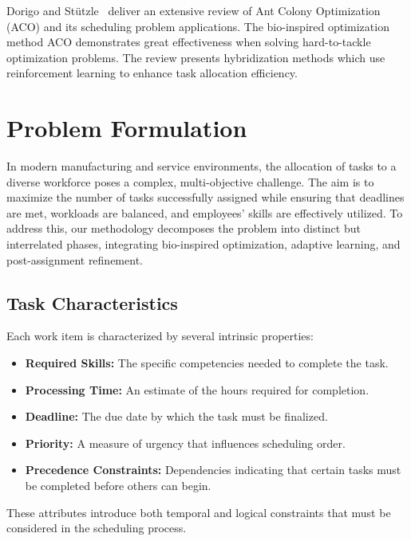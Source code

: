 \documentclass[%
aip,
cp,  %
amsmath,amssymb,
reprint,%
]{revtex4-2}
\begin{document}
	Dorigo and Stützle~\cite{dorigo2016} deliver an extensive review of Ant Colony
	Optimization (ACO) and its scheduling problem applications. The bio-inspired optimization
	method ACO demonstrates great effectiveness when solving hard-to-tackle optimization
	problems. The review presents hybridization methods which use reinforcement
	learning to enhance task allocation efficiency.
	
	\section{\label{sec:problem}Problem Formulation}
	
	In modern manufacturing and service environments, the allocation of tasks to a
	diverse workforce poses a complex, multi-objective challenge. The aim is to
	maximize the number of tasks successfully assigned while ensuring that
	deadlines are met, workloads are balanced, and employees' skills are
	effectively utilized. To address this, our methodology decomposes the problem
	into distinct but interrelated phases, integrating bio-inspired optimization,
	adaptive learning, and post-assignment refinement.
	
	\subsection{\label{subsec:task}Task Characteristics}
	
	Each work item is characterized by several intrinsic properties:
	\begin{itemize}
		\item \textbf{Required Skills:} The specific competencies needed to complete
		the task.
		
		\item \textbf{Processing Time:} An estimate of the hours required for
		completion.
		
		\item \textbf{Deadline:} The due date by which the task must be finalized.
		
		\item \textbf{Priority:} A measure of urgency that influences scheduling
		order.
		
		\item \textbf{Precedence Constraints:} Dependencies indicating that certain
		tasks must be completed before others can begin.
	\end{itemize}
	These attributes introduce both temporal and logical constraints that must be considered
	in the scheduling process.
	
\end{document}

